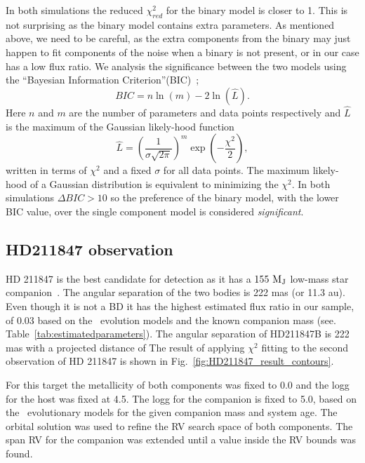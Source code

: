 In both simulations the reduced \(\chi^2_{red}\) for the binary model is closer to 1. This is not surprising as the binary model contains extra parameters. As mentioned above, we need to be careful, as the extra components from the binary may just happen to fit components of the noise when a binary is not present, or in our case has a low flux ratio. 
{\rd{} We analysis the significance between the two models using the ``Bayesian Information Criterion''(BIC)~\citep{schwarz_estimating_1978}; }
\begin{equation}
BIC = n\ln{(m)} - 2\ln{(\hat{L})}.
\end{equation}
{\rd{} Here $n$ and $m$ are the number of parameters and data points respectively and \(\hat{L}\) is the maximum of the Gaussian likely-hood function }
\begin{equation}
\hat{L} = \left(\frac{1}{\sigma \sqrt{2\pi}}\right)^m \exp{\left(-\frac{\chi^2}{2}\right)},
\end{equation}
{\rd{} written in terms of \(\chi^2\) and a fixed $\sigma$ for all data points. The maximum likely-hood of a Gaussian distribution is equivalent  to minimizing the \(\chi^2\). In both simulations \(\Delta BIC >10\) so the preference of the binary model, with the lower BIC value, over the single component model is considered \emph{significant}.}



\subsection{HD211847 observation}
\label{subsection:results-hd211847}
{HD 211847} is the best candidate for detection as it has a \(\rm 155~M_J\) low-mass star companion~\citet{moutou_eccentricity_2017}. The angular separation of the two bodies is 222 mas (or 11.3 au). Even though it is not a BD it has the highest estimated flux ratio in our sample, of 0.03 based on the~\citet{baraffe_new_2015} evolution models and the known companion mass (see. Table~\ref{tab:estimatedparameters}). The angular separation of HD211847B is 222 mas with a projected distance of The result of applying \(\chi^2\) fitting to the second observation of {HD 211847} is shown in Fig.~\ref{fig:HD211847_result_contours}.

For this target the metallicity of both components was fixed to 0.0 and the logg for the host was fixed at 4.5. The logg for the companion is fixed to 5.0, based on the~\citet{baraffe_new_2015} evolutionary models for the given companion mass and system age. The orbital solution was used to refine the RV search space of both components. The span RV for the companion was extended until a value inside the RV bounds was found.

